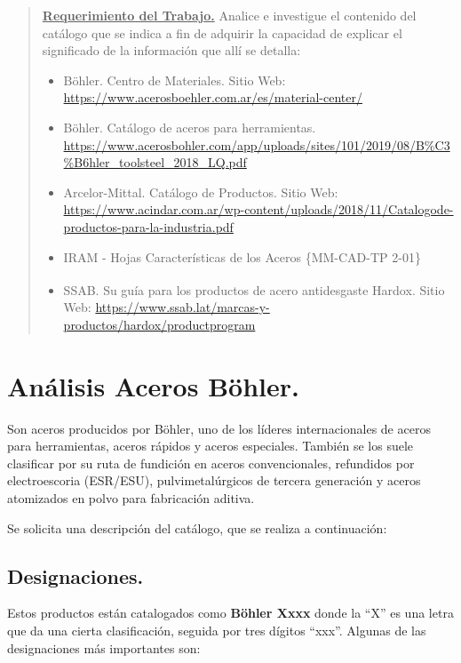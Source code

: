 \documentclass[12pt,a4paper]{article}
\begin{document}

\tableofcontents
\begin{abstract}
    \underline{\textbf{Requerimiento del Trabajo.}}
    Analice e investigue el contenido del catálogo que se indica a fin de adquirir la capacidad de explicar el significado de la información que allí se detalla:
    \begin{itemize}
        \item Böhler. Centro de Materiales. Sitio Web: \url{https://www.acerosboehler.com.ar/es/material-center/}
        \item Böhler. Catálogo de aceros para herramientas. \url{https://www.acerosbohler.com/app/uploads/sites/101/2019/08/B%C3%B6hler_toolsteel_2018_LQ.pdf}
        \item Arcelor-Mittal. Catálogo de Productos. Sitio Web: \url{https://www.acindar.com.ar/wp-content/uploads/2018/11/Catalogode-productos-para-la-industria.pdf}
        \item IRAM - Hojas Características de los Aceros \{MM-CAD-TP 2-01\}
        \item SSAB. Su guía para los productos de acero antidesgaste Hardox\textsuperscript{\textregistered}. Sitio Web: \url{https://www.ssab.lat/marcas-y-productos/hardox/productprogram}
    \end{itemize}
\end{abstract}

\section{Análisis Aceros Böhler.}
Son aceros producidos por Böhler, uno de los líderes internacionales de aceros para herramientas, aceros rápidos y aceros especiales. También se los suele clasificar por su ruta de fundición en aceros convencionales, refundidos por electroescoria (ESR/ESU), pulvimetalúrgicos de tercera generación y aceros atomizados en polvo para fabricación aditiva.

Se solicita una descripción del catálogo, que se realiza a continuación:

\subsection{Designaciones.}
Estos productos están catalogados como \textbf{Böhler Xxxx} donde la “X” es una letra que da una cierta clasificación, seguida por tres dígitos “xxx”. Algunas de las designaciones más importantes son:
\end{document}
